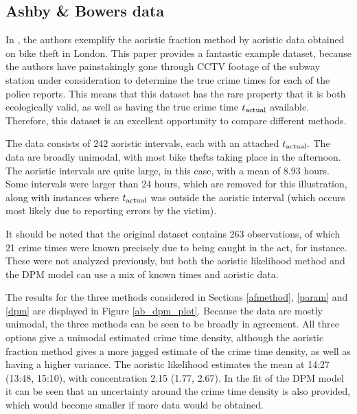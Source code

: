 \subsection{Ashby \& Bowers data}

In \citet{ashby2013comparison}, the authors exemplify the aoristic fraction method by aoristic data obtained on bike theft in London. This paper provides a fantastic example dataset, because the authors have painstakingly gone through CCTV footage of the subway station under consideration to determine the true crime times for each of the police reports. This means that this dataset has the rare property that it is both ecologically valid, as well as having the true crime time $t_{\text{actual}}$ available. Therefore, this dataset is an excellent opportunity to compare different methods.

The data consists of 242 aoristic intervals, each with an attached $t_{\text{actual}}.$ The data are broadly unimodal, with most bike thefts taking place in the afternoon. The aoristic intervals are quite large, in this case, with a mean of 8.93 hours. Some intervals were larger than 24 hours, which are removed for this illustration, along with instances where $t_{\text{actual}}$ was outside the aoristic interval (which occurs most likely due to reporting errors by the victim).

It should be noted that the original dataset contains 263 observations, of which 21 crime times were known precisely due to being caught in the act, for instance. These were not analyzed previously, but both the aoristic likelihood method and the DPM model can use a mix of known times and aoristic data.

The results for the three methods considered in Sections \ref{afmethod}, \ref{param} and \ref{dpm} are displayed in Figure \ref{ab_dpm_plot}. Because the data are mostly unimodal, the three methods can be seen to be broadly in agreement. All three options give a unimodal estimated crime time density, although the aoristic fraction method gives a more jagged estimate of the crime time density, as well as having a higher variance. The aoristic likelihood estimates the mean at 14:27 (13:48, 15:10), with concentration 2.15 (1.77, 2.67). In the fit of the DPM model it can be seen that an uncertainty around the crime time density is also provided, which would become smaller if more data would be obtained.



